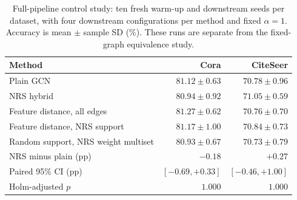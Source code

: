 \begin{table}[htbp]
\centering
\caption{Full-pipeline control study: ten fresh warm-up and downstream seeds per dataset, with four downstream configurations per method and fixed $\alpha=1$. Accuracy is mean $\pm$ sample SD (\%). These runs are separate from the fixed-graph equivalence study.}
\label{tab:full-pipeline}
\begin{tabular}{lrr}
\toprule
Method & Cora & CiteSeer \\
\midrule
Plain GCN & $81.12 \pm 0.63$ & $70.78 \pm 0.96$ \\
NRS hybrid & $80.94 \pm 0.92$ & $71.05 \pm 0.59$ \\
Feature distance, all edges & $81.27 \pm 0.62$ & $70.76 \pm 0.70$ \\
Feature distance, NRS support & $81.17 \pm 1.00$ & $70.84 \pm 0.73$ \\
Random support, NRS weight multiset & $80.93 \pm 0.67$ & $70.73 \pm 0.79$ \\
\midrule
NRS minus plain (pp) & $-0.18$ & $+0.27$ \\
Paired 95\% CI (pp) & $[-0.69, +0.33]$ & $[-0.46, +1.00]$ \\
Holm-adjusted $p$ & $1.000$ & $1.000$ \\
\bottomrule
\end{tabular}
\end{table}

